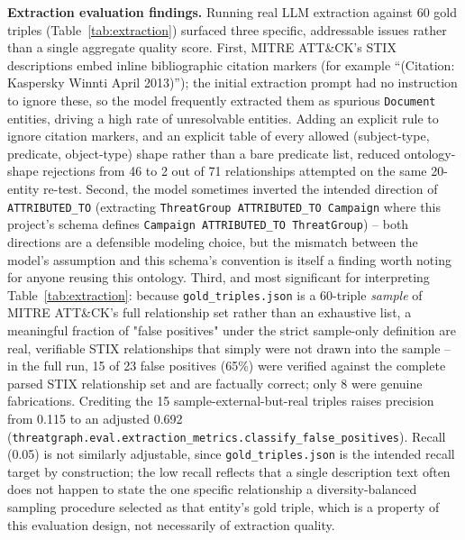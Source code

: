 \documentclass[conference]{IEEEtran}
\begin{document}
\textbf{Extraction evaluation findings.} Running real LLM extraction against
60 gold triples (Table~\ref{tab:extraction}) surfaced three specific,
addressable issues rather than a single aggregate quality score. First, MITRE
ATT\&CK's STIX descriptions embed inline bibliographic citation markers (for
example ``(Citation: Kaspersky Winnti April 2013)''); the initial extraction
prompt had no instruction to ignore these, so the model frequently extracted
them as spurious \texttt{Document} entities, driving a high rate of
unresolvable entities. Adding an explicit rule to ignore citation markers,
and an explicit table of every allowed (subject-type, predicate,
object-type) shape rather than a bare predicate list, reduced ontology-shape
rejections from 46 to 2 out of 71 relationships attempted on the same
20-entity re-test. Second, the model sometimes inverted the intended
direction of \texttt{ATTRIBUTED\_TO} (extracting \texttt{ThreatGroup
ATTRIBUTED\_TO Campaign} where this project's schema defines \texttt{Campaign
ATTRIBUTED\_TO ThreatGroup}) -- both directions are a defensible modeling
choice, but the mismatch between the model's assumption and this schema's
convention is itself a finding worth noting for anyone reusing this
ontology. Third, and most significant for interpreting Table~\ref{tab:extraction}:
because \texttt{gold\_triples.json} is a 60-triple \emph{sample} of MITRE
ATT\&CK's full relationship set rather than an exhaustive list, a meaningful
fraction of "false positives" under the strict sample-only definition are
real, verifiable STIX relationships that simply were not drawn into the
sample -- in the full run, 15 of 23 false positives (65\%) were verified
against the complete parsed STIX relationship set and are factually correct;
only 8 were genuine fabrications. Crediting the 15 sample-external-but-real
triples raises precision from 0.115 to an adjusted 0.692
(\texttt{threatgraph.eval.extraction\_metrics.classify\_false\_positives}).
Recall (0.05) is not similarly adjustable, since \texttt{gold\_triples.json}
is the intended recall target by construction; the low recall reflects that
a single description text often does not happen to state the one specific
relationship a diversity-balanced sampling procedure selected as that
entity's gold triple, which is a property of this evaluation design, not
necessarily of extraction quality.
\end{document}
